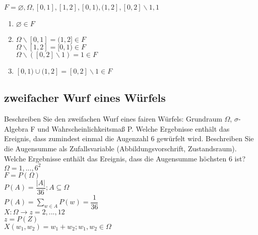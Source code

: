 \documentclass[paper=a4, fontsize=11pt]{scrartcl}
\numberwithin{equation}{section}
\numberwithin{figure}{section}
\numberwithin{table}{section}
\begin{document}
$F={\varnothing,\Omega,[0,1],[1,2],[0,1),(1,2],[0,2] \backslash {1},{1}}$ 

\begin{enumerate}
\item $\varnothing \in F$
\item $\Omega \backslash [0,1] = (1,2] \in F$ \\
         $\Omega \backslash [1,2] = [0,1) \in F$ \\
         $\Omega \backslash ([0,2] \backslash {1}) = {1} \in F$ \\
\item $[0,1) \cup (1,2] = [0,2] \backslash {1} \in F$
\end{enumerate}

\subsection{zweifacher Wurf eines Würfels}
Beschreiben Sie den zweifachen Wurf eines fairen Würfels: Grundraum $ \Omega$, $ \sigma$-Algebra F und Wahrscheinlichkeitsmaß P. Welche Ergebnisse enthält das Ereignis, dass zumindest einmal die Augenzahl 6 gewürfelt wird. Beschreiben Sie die Augensumme als Zufallsvariable (Abbildungsvorschrift, Zustandsraum). Welche Ergebnisse enthält das Ereignis, dass die Augensumme höchsten 6 ist? \\

$\Omega = {1,...,6}^{2}$ \\
$F = P( \Omega)$ \\
$P(A)= \dfrac{|A|}{36} ; A \subseteq \Omega$ \\
$P(A) = \sum _{w \in A} P({w})= \dfrac{1}{36}$ \\
$X: \Omega \rightarrow z= {2,...,12}$ \\
$z=P(Z)$ \\
$X(w_{1},w_{2})=w_{1}+w_{2} ; w_{1}, w_{2} \in \Omega$

\end{document}
